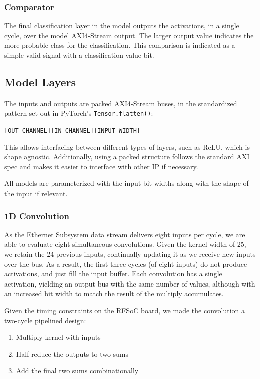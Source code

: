 \documentclass[conference]{IEEEtran}
\begin{document}
\subsubsection{Comparator}
The final classification layer in the model outputs the activations,
in a single cycle, over the model AXI4-Stream output.
The larger output value indicates the more probable class for the
classification.
This comparison is indicated as a simple valid signal
with a classification value bit.

\subsection{Model Layers}\label{ref:model-layers}
The inputs and outputs are packed AXI4-Stream buses,
in the standardized pattern set out in PyTorch's \texttt{Tensor.flatten()}:
\begin{center}
    \texttt{[OUT\_CHANNEL][IN\_CHANNEL][INPUT\_WIDTH]}
\end{center}

This allows interfacing between different types of layers,
such as ReLU, which is shape agnostic.
Additionally, using a packed structure follows the standard
AXI spec and makes it easier to interface with other IP if necessary.

All models are parameterized with the input bit widths
along with the shape of the input if relevant.

\subsubsection{1D Convolution}
As the Ethernet Subsystem data stream delivers eight inputs per cycle,
we are able to evaluate eight simultaneous convolutions.
Given the kernel width of 25, we retain the 24 previous inputs,
continually updating it as we receive new inputs over the bus.
As a result, the first three cycles (of eight inputs) do not produce activations,
and just fill the input buffer.
Each convolution has a single activation,
yielding an output bus with the same number of values,
although with an increased bit width to match the result
of the multiply accumulates.

Given the timing constraints on the RFSoC board,
we made the convolution a two-cycle pipelined design:
\begin{enumerate}
    \item Multiply kernel with inputs
    \item Half-reduce the outputs to two sums
    \item Add the final two sums combinationally
\end{enumerate}
\end{document}
